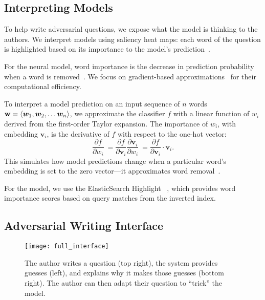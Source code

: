 \subsection{Interpreting \qb{} Models}

To help write adversarial questions, we expose
what the model is thinking to the authors.
We interpret models using saliency heat maps: each word of the
question is highlighted based on its importance to the model's
prediction~\cite{ribeiro2016should}.

For the neural model, word importance is the decrease in
prediction probability when a word is
removed~\cite{li2016understanding,wallace2018Neighbors}.
We focus on gradient-based
approximations~\cite{simonyan2013saliency,montavon2017methods}
for their computational efficiency.

\setlength{\abovedisplayskip}{10pt}
\setlength{\belowdisplayskip}{10pt}
To interpret a model prediction on an input sequence of $n$
words~$\boldsymbol{\mathbf{w}}=\langle\bm{w}_1, \bm{w}_2, \ldots
\bm{w}_n\rangle$, we approximate the classifier $f$ with a linear
function of $w_i$ derived from the first-order Taylor expansion. The
importance of $w_i$, with embedding $\bm{v}_i$, is the derivative
of $f$ with respect to the one-hot vector: 
\begin{equation} \frac{\partial f}{\partial w_i} \
   = \frac{\partial f}{\partial \bm{v}_i}\frac{\partial \bm{v}_i}{\partial w_i} \ 
   = \frac{\partial f}{\partial \bm{v}_i} \cdot \bm{v}_i. 
\end{equation} 
This simulates how model predictions change when a particular word's embedding is set to the zero vector---it approximates word removal~\cite{ebrahimi2017hotflip,wallace2018Neighbors}.

For the \abr{ir} model, we use the ElasticSearch Highlight
~\cite{gormley2015elasticsearch}, which provides word
importance scores based on query matches from the inverted index.

\subsection{Adversarial Writing Interface}

\begin{figure*}[t]
\centering
\texttt{[image: full\_interface]}
\caption{The author writes a question (top right), the  system provides
  guesses (left), and explains why it makes those guesses (bottom
  right). The author can then adapt their question to ``trick'' the
  model.}
\label{interface}
\end{figure*}

